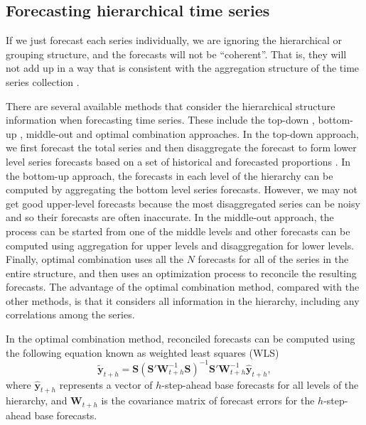 \documentclass[11pt,a4paper,]{article}
\begin{document}
\hypertarget{forecasting-hierarchical-time-series}{%
\subsection{Forecasting hierarchical time series}\label{forecasting-hierarchical-time-series}}

If we just forecast each series individually, we are ignoring the hierarchical or grouping structure, and the forecasts will not be ``coherent''. That is, they will not add up in a way that is consistent with the aggregation structure of the time series collection \autocite{fpp2}.

There are several available methods that consider the hierarchical structure information when forecasting time series. These include the top-down \autocite{gross1990disaggregation,fliedner2001hierarchical}, bottom-up \autocite{kahn1998revisiting}, middle-out and optimal combination \autocite{hyndman2011optimal} approaches. In the top-down approach, we first forecast the total series and then disaggregate the forecast to form lower level series forecasts based on a set of historical and forecasted proportions \autocite[for details see][]{athanasopoulos2009hierarchical}. In the bottom-up approach, the forecasts in each level of the hierarchy can be computed by aggregating the bottom level series forecasts. However, we may not get good upper-level forecasts because the most disaggregated series can be noisy and so their forecasts are often inaccurate. In the middle-out approach, the process can be started from one of the middle levels and other forecasts can be computed using aggregation for upper levels and disaggregation for lower levels. Finally, optimal combination uses all the \(N\) forecasts for all of the series in the entire structure, and then uses an optimization process to reconcile the resulting forecasts. The advantage of the optimal combination method, compared with the other methods, is that it considers all information in the hierarchy, including any correlations among the series.

In the optimal combination method, reconciled forecasts can be computed using the following equation known as weighted least squares (WLS) \autocite{mint2018}
\begin{equation}\label{eq:mint}
  \tilde{\bm{y}}_{t+h}=\bm{S}(\bm{S}'\bm{W}_{t+h}^{-1}\bm{S})^{-1}\bm{S}'\bm{W}_{t+h}^{-1}\hat{\bm{y}}_{t+h},
\end{equation}
where \(\hat{\bm{y}}_{t+h}\) represents a vector of \(h\)-step-ahead base forecasts for all levels of the hierarchy, and \(\bm{W}_{t+h}\) is the covariance matrix of forecast errors for the \(h\)-step-ahead base forecasts.
\end{document}
